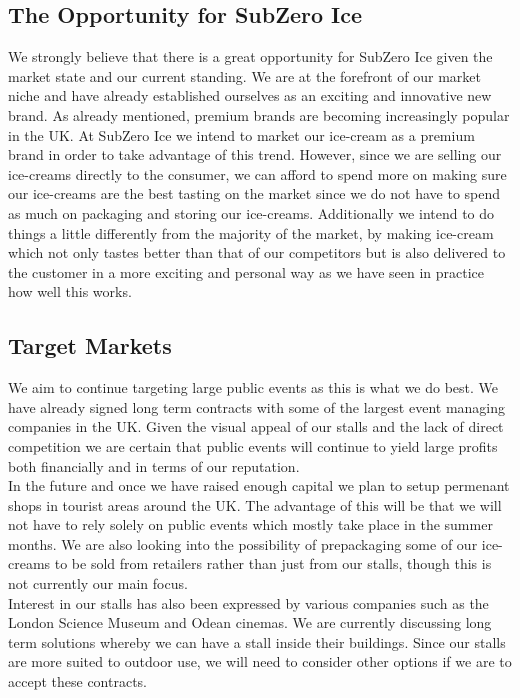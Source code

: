 \documentclass{article}
\begin{document}
  \subsection{The Opportunity for SubZero Ice}

  We strongly believe that there is a great opportunity for SubZero Ice given the market state and our current standing. We are at the forefront of our market niche and have already established ourselves as an exciting and innovative new brand. As already mentioned, premium brands are becoming increasingly popular in the UK. At SubZero Ice we intend to market our ice-cream as a premium brand in order to take advantage of this trend. However, since we are selling our ice-creams directly to the consumer, we can afford to spend more on making sure our ice-creams are the best tasting on the market since we do not have to spend as much on packaging and storing our ice-creams. Additionally we intend to do things a little differently from the majority of the market, by making ice-cream which not only tastes better than that of our competitors but is also delivered to the customer in a more exciting and personal way as we have seen in practice how well this works. \\


  \subsection{Target Markets}

  We aim to continue targeting large public events as this is what we do best. We have already signed long term contracts with some of the largest event managing companies in the UK. Given the visual appeal of our stalls and the lack of direct competition we are certain that public events will continue to yield large profits both financially and in terms of our reputation. \\

  In the future and once we have raised enough capital we plan to setup permenant shops in tourist areas around the UK. The advantage of this will be that we will not have to rely solely on public events which mostly take place in the summer months. We are also looking into the possibility of prepackaging some of our ice-creams to be sold from retailers rather than just from our stalls, though this is not currently our main focus. \\

  Interest in our stalls has also been expressed by various companies such as the London Science Museum and Odean cinemas. We are currently discussing long term solutions whereby we can have a stall inside their buildings. Since our stalls are more suited to outdoor use, we will need to consider other options if we are to accept these contracts. \\
\end{document}
